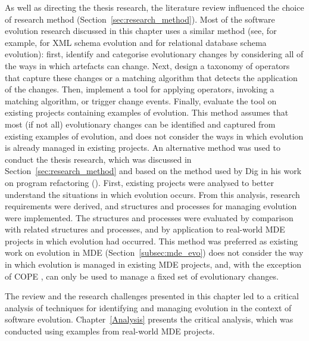 As well as directing the thesis research, the literature review influenced the choice of research method (Section~\ref{sec:research_method}). Most of the software evolution research discussed in this chapter uses a similar method (see, for example, \cite{guerrini05impact,kramer01xem,su01xem} for XML schema evolution and \cite{banerjee87semantics,edelweiss05temporal} for relational database schema evolution): first, identify and categorise evolutionary changes by considering all of the ways in which artefacts can change. Next, design a taxonomy of operators that capture these changes or a matching algorithm that detects the application of the changes. Then, implement a tool for applying operators, invoking a matching algorithm, or trigger change events. Finally, evaluate the tool on existing projects containing examples of evolution. This method assumes that most (if not all) evolutionary changes can be identified and captured from existing examples of evolution, and does not consider the ways in which evolution is already managed in existing projects. An alternative method was used to conduct the thesis research, which was discussed in Section~\ref{sec:research_method} and based on the method used by Dig in his work on program refactoring (\cite{dig07thesis}). First, existing projects were analysed to better understand the situations in which evolution occurs. From this analysis, research requirements were derived, and structures and processes for managing evolution were implemented. The structures and processes were evaluated by comparison with related structures and processes, and by application to real-world MDE projects in which evolution had occurred. This method was preferred as existing work on evolution in MDE (Section~\ref{subsec:mde_evo}) does not consider the way in which evolution is managed in existing MDE projects, and, with the exception of COPE \cite{herrmannsdoerfer09cope}, can only be used to manage a fixed set of evolutionary changes.

The review and the research challenges presented in this chapter led to a critical analysis of techniques for identifying and managing evolution in the context of software evolution. Chapter~\ref{Analysis} presents the critical analysis, which was conducted using examples from real-world MDE projects.